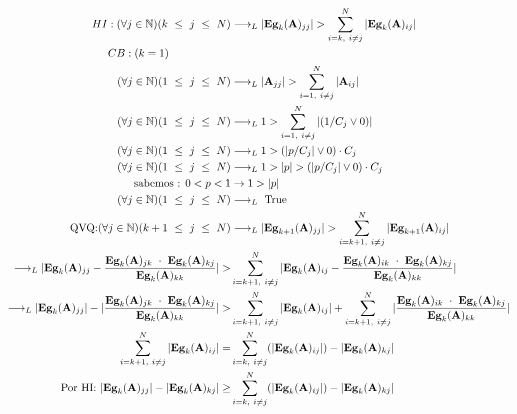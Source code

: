 \begin{align*}
    HI: (\forall j \in \mathbb{N}) (k \ \leq \ j \ \leq \ N ) &\longrightarrow_L |\textbf{Eg}_{k}(\textbf{A})_{jj}| > \sum_{i=k, \ i \neq j}^{N} |\textbf{Eg}_{k}(\textbf{A})_{ij}| \\
    \noindent CB: (k = 1) \ \ \ \ \ \ \ \ \ \ \ \ \ \ \ \ \ \\
    (\forall j \in \mathbb{N}) (1 \ \leq \ j \ \leq \ N ) &\longrightarrow_L |\textbf{A}_{jj}| > \sum_{i=1, \ i \neq j}^{N} |\textbf{A}_{ij}| \\
    (\forall j \in \mathbb{N}) (1 \ \leq \ j \ \leq \ N ) &\longrightarrow_L 1 > \sum_{i=1, \ i \neq j}^{N} |(1/C_j \vee 0)| \\
    (\forall j \in \mathbb{N}) (1 \ \leq \ j \ \leq \ N ) &\longrightarrow_L 1 > (|p/C_j| \vee 0) \cdot C_j \\
    (\forall j \in \mathbb{N}) (1 \ \leq \ j \ \leq \ N ) &\longrightarrow_L 1 > |p| > (|p/C_j| \vee 0) \cdot C_j \\
    \text{sabemos : } 0 < p < 1  &\rightarrow 1 > |p| \\
    (\forall j \in \mathbb{N}) (1 \ \leq \ j \ \leq \ N ) &\longrightarrow_L \ \text{True} \\ 
    \text{QVQ:} (\forall j \in \mathbb{N}) (k+1 \ \leq \ j \ \leq \ N ) &\longrightarrow_L |\textbf{Eg}_{k+1}(\textbf{A})_{jj}| > \sum_{i=k+1, \ i \neq j}^{N} |\textbf{Eg}_{k+1}(\textbf{A})_{ij}| \\
    \longrightarrow_L |\textbf{Eg}_{k}(\textbf{A})_{jj} - \frac {\textbf{Eg}_{k}(\textbf{A})_{jk} \ \cdot \ \textbf{Eg}_{k}(\textbf{A})_{kj}}{\textbf{Eg}_{k}(\textbf{A})_{kk}}| > &\sum_{i=k+1, \ i \neq j}^{N} |\textbf{Eg}_{k}(\textbf{A})_{ij} - \frac {\textbf{Eg}_{k}(\textbf{A})_{ik} \ \cdot \ \textbf{Eg}_{k}(\textbf{A})_{kj}}{\textbf{Eg}_{k}(\textbf{A})_{kk}}| \\
    \longrightarrow_L |\textbf{Eg}_{k}(\textbf{A})_{jj}| - |\frac {\textbf{Eg}_{k}(\textbf{A})_{jk} \ \cdot \ \textbf{Eg}_{k}(\textbf{A})_{kj}}{\textbf{Eg}_{k}(\textbf{A})_{kk}}| > &\sum_{i=k+1, \ i \neq j}^{N} |\textbf{Eg}_{k}(\textbf{A})_{ij}| +  \sum_{i=k+1, \ i \neq j}^{N} |\frac{\textbf{Eg}_{k}(\textbf{A})_{ik} \ \cdot \ \textbf{Eg}_{k}(\textbf{A})_{kj}}{\textbf{Eg}_{k}(\textbf{A})_{kk}}| \\
    \sum_{i=k+1, \ i \neq j}^{N} |\textbf{Eg}_{k}(\textbf{A})_{ij}| = &\sum_{i=k, \ i \neq j}^{N} (|\textbf{Eg}_{k}(\textbf{A})_{ij}|) -  |\textbf{Eg}_{k}(\textbf{A})_{kj}|\\
    \text{Por HI: } |\textbf{Eg}_{k}(\textbf{A})_{jj}| - |\textbf{Eg}_{k}(\textbf{A})_{kj}| \geq &\sum_{i=k, \ i \neq j}^{N} (|\textbf{Eg}_{k}(\textbf{A})_{ij}|) -  |\textbf{Eg}_{k}(\textbf{A})_{kj}|\\

\end{align*}
